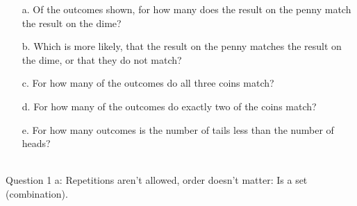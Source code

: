 {\begin{questionNOGRADE}{\thequestion}
\begin{center}
        \end{center}

        \begin{enumerate}
                \item[a.]   Of the outcomes shown, for how many does
                            the result on the penny match the result on the dime?

                \item[b.]   Which is more likely, that the result on the penny
                            matches the result on the dime, or that they do not match?

                \item[c.]   For how many of the outcomes do all three coins match?

                \item[d.]   For how many of the outcomes do exactly two of the coins match?

                \item[e.]   For how many outcomes is the number of tails less than the number of heads?
        \end{enumerate}
        
    \end{questionNOGRADE}

}{
    ~\\ Question 1 a:   Repetitions aren't allowed, order doesn't matter: Is a set (combination).

}
